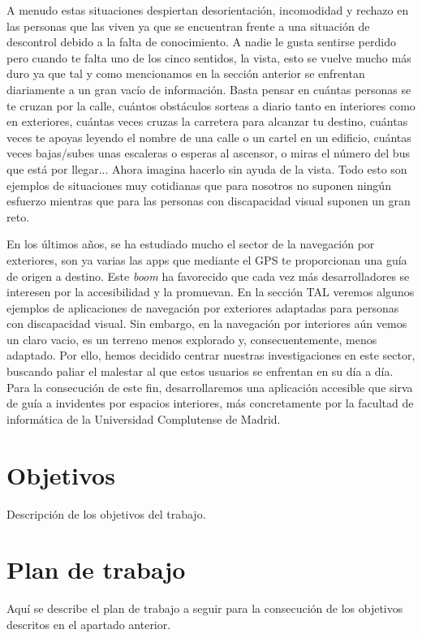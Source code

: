 A menudo estas situaciones despiertan desorientación, incomodidad y rechazo en las personas que las viven ya que se encuentran frente a una situación de descontrol debido a la falta de conocimiento. A nadie le gusta sentirse perdido pero cuando te falta uno de los cinco sentidos, la vista, esto se vuelve mucho más duro ya que tal y como mencionamos en la sección anterior se enfrentan diariamente a un gran vacío de información. Basta pensar en cuántas personas se te cruzan por la calle, cuántos obstáculos sorteas a diario tanto en interiores como en exteriores, cuántas veces cruzas la carretera para alcanzar tu destino, cuántas veces te apoyas leyendo el nombre de una calle o un cartel en un edificio, cuántas veces bajas/subes unas escaleras o esperas al ascensor, o miras el número del bus que está por llegar... Ahora imagina hacerlo sin ayuda de la vista. Todo esto son ejemplos de situaciones muy cotidianas que para nosotros no suponen ningún esfuerzo mientras que para las personas con discapacidad visual suponen un gran reto. 

En los últimos años, se ha estudiado mucho el sector de la navegación por exteriores, son ya varias las apps que mediante el GPS te proporcionan una guía de origen a destino. Este \textit{boom} ha favorecido que cada vez más desarrolladores se interesen por la accesibilidad y la promuevan. En la sección TAL veremos algunos ejemplos de aplicaciones de navegación por exteriores adaptadas para personas con discapacidad visual. Sin embargo, en la navegación por interiores aún vemos un claro vacio, es un terreno menos explorado y, consecuentemente, menos adaptado. Por ello, hemos decidido centrar nuestras investigaciones en este sector, buscando paliar el malestar al que estos usuarios se enfrentan en su día a día. Para la consecución de este fin, desarrollaremos una aplicación accesible que sirva de guía a invidentes por espacios interiores, más concretamente por la facultad de informática de la Universidad Complutense de Madrid.




\section{Objetivos}

Descripción de los objetivos del trabajo.


\section{Plan de trabajo}
Aquí se describe el plan de trabajo a seguir para la consecución de los objetivos descritos en el apartado anterior.



